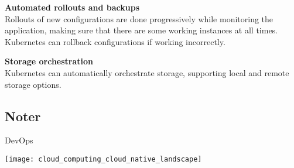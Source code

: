 \textbf{Automated rollouts and backups}\\
Rollouts of new configurations are done progressively while monitoring the application, making sure that there are some working instances at all times. Kubernetes can rollback configurations if working incorrectly.

\textbf{Storage orchestration}\\
Kubernetes can automatically orchestrate storage, supporting local and remote storage options.


\subsection*{Noter}
DevOps

\texttt{[image: cloud\_computing\_cloud\_native\_landscape]}

%
%